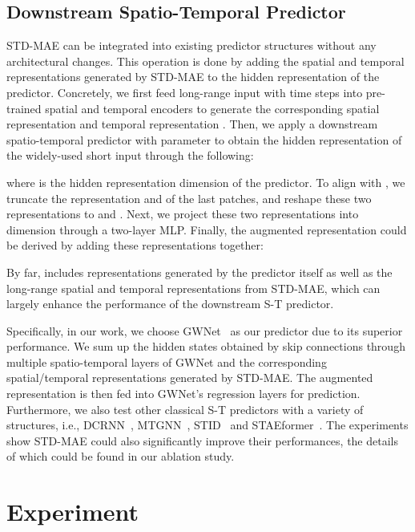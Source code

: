 \documentclass[letterpaper]{article} \usepackage{aaai24}  \usepackage{times}  \usepackage{helvet}  \usepackage{courier}  \usepackage[hyphens]{url}  \usepackage{graphicx} \urlstyle{rm} \def\UrlFont{\rm}  \usepackage{natbib}  \usepackage{caption} \frenchspacing  \setlength{\pdfpagewidth}{8.5in} \setlength{\pdfpageheight}{11in} \usepackage{algorithm}
\begin{document}
\subsection{Downstream Spatio-Temporal Predictor}
STD-MAE can be integrated into existing predictor structures without any architectural changes. This operation is done by adding the spatial and temporal representations generated by STD-MAE to the hidden representation of the predictor. Concretely, we first feed long-range input with  time steps into pre-trained spatial and temporal encoders to generate the corresponding spatial  representation and temporal representation . Then, we apply a downstream spatio-temporal predictor  with parameter  to obtain the hidden representation   of the widely-used short input  through the following:

where  is the hidden representation dimension of the predictor. To align with , we truncate the representation  and  of the last  patches, and reshape these two representations to  and . Next, we project these two representations into  dimension through a two-layer MLP. Finally, the augmented representation  could be derived by adding these representations together:

By far,  includes representations generated by the predictor itself as well as the long-range spatial and temporal representations from STD-MAE, which can largely enhance the performance of the downstream S-T predictor. 

Specifically, in our work, we choose GWNet~\cite{wu2019graph} as our predictor due to its superior performance. We sum up the hidden states obtained by skip connections through multiple spatio-temporal layers of GWNet and the corresponding spatial/temporal representations generated by STD-MAE. The augmented representation is then fed into GWNet's regression layers for prediction. Furthermore, we also test other classical S-T predictors with a variety of structures, i.e., DCRNN~\cite{li2018diffusion}, MTGNN~\cite{wu2020connecting}, STID~\cite{shao2022spatial} and STAEformer~\cite{liu2023spatio}. The experiments show STD-MAE could also significantly improve their performances, the details of which could be found in our ablation study. 








\section{Experiment}\label{sec:experiment-setup}
\end{document}
